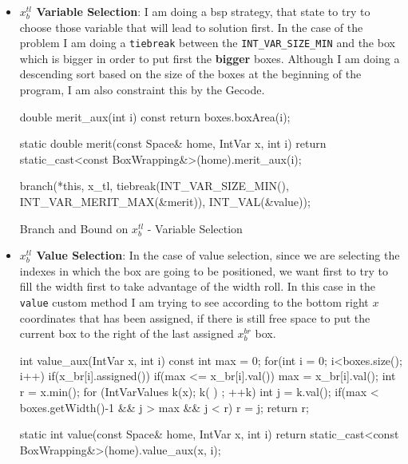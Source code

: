 \documentclass[12pt, a4paper]{article}
\begin{document}
\begin{itemize}
  \item \textbf{$x_b^{tl}$ Variable Selection}: I am doing a \acrfull{bsp} strategy, that state to try to choose those variable that will lead to solution first. In the case of the problem I am doing a \texttt{tiebreak} between the \texttt{INT_VAR_SIZE_MIN} and the box which is bigger in order to put first the \textbf{bigger} boxes. Although I am doing a descending sort based on the size of the boxes at the beginning of the program, I am also constraint this by the Gecode.


\begin{listing}[H]
\begin{cppcode*}{}
  double merit_aux(int i) const{
    return boxes.boxArea(i);
  }

  static double merit(const Space& home, IntVar x, int i){
    return static_cast<const BoxWrapping&>(home).merit_aux(i);
  }

  branch(*this, x_tl,
                tiebreak(INT_VAR_SIZE_MIN(),
                         INT_VAR_MERIT_MAX(&merit)),
                INT_VAL(&value));
\end{cppcode*}
\caption{Branch and Bound on $x_b^{tl}$ - Variable Selection}
\label{lst:branch_var_x_tl}
\end{listing}

\item \textbf{$x_b^{tl}$ Value Selection}: In the case of value selection, since we are selecting the indexes in which the box are going to be positioned, we want first to try to fill the width first to take advantage of the width roll. In this case in the \texttt{value} custom method I am trying to see according to the bottom right $x$ coordinates that has been assigned, if there is still free space to put the current box to the right of the last assigned $x_b^{br}$ box.


\begin{listing}[H]
\begin{cppcode*}{}
  int value_aux(IntVar x, int i) const {
    int max = 0;
    for(int i = 0; i<boxes.size(); i++){
      if(x_br[i].assigned()){
        if(max <= x_br[i].val()){
          max = x_br[i].val();
        }
      }
    }
    int r = x.min();
    for (IntVarValues k(x); k( ) ; ++k) {
      int j  = k.val();
      if(max < boxes.getWidth()-1 && j > max && j < r){
        r = j;
      }
    }
    return r;
  }

  static int value(const Space& home, IntVar x, int i) {
    return static_cast<const BoxWrapping&>(home).value_aux(x, i);
  }


\end{cppcode*}
\end{listing}
\end{itemize}
\end{document}
